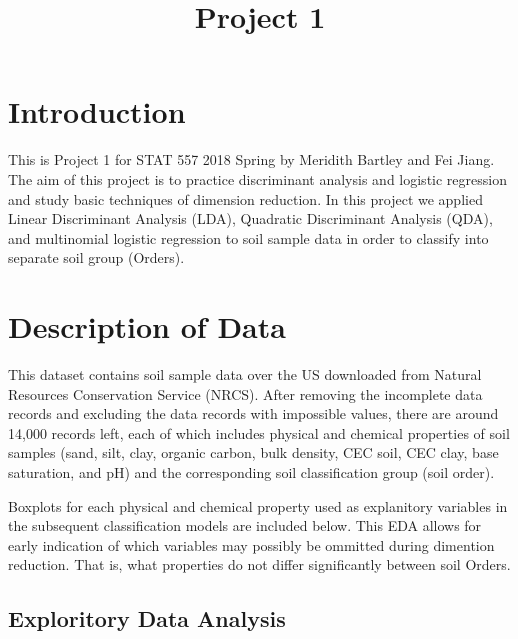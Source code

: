 \documentclass[]{article}
\title{Project 1}
\author{}
\date{}
\begin{document}
\maketitle

\section{Introduction}\label{introduction}

This is Project 1 for STAT 557 2018 Spring by Meridith Bartley and Fei
Jiang. The aim of this project is to practice discriminant analysis and
logistic regression and study basic techniques of dimension reduction.
In this project we applied Linear Discriminant Analysis (LDA), Quadratic
Discriminant Analysis (QDA), and multinomial logistic regression to soil
sample data in order to classify into separate soil group (Orders).

\section{Description of Data}\label{description-of-data}

This dataset contains soil sample data over the US downloaded from
Natural Resources Conservation Service (NRCS). After removing the
incomplete data records and excluding the data records with impossible
values, there are around 14,000 records left, each of which includes
physical and chemical properties of soil samples (sand, silt, clay,
organic carbon, bulk density, CEC soil, CEC clay, base saturation, and
pH) and the corresponding soil classification group (soil order).

Boxplots for each physical and chemical property used as explanitory
variables in the subsequent classification models are included below.
This EDA allows for early indication of which variables may possibly be
ommitted during dimention reduction. That is, what properties do not
differ significantly between soil Orders.

\subsection{Exploritory Data Analysis}\label{exploritory-data-analysis}
\end{document}
